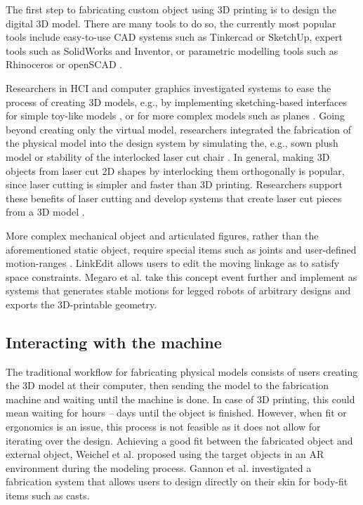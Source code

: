 The first step to fabricating custom object using 3D printing is to design the digital 3D model. There are many tools to do so, the currently most popular tools include easy-to-use CAD systems such as Tinkercad or SketchUp, expert tools such as SolidWorks and Inventor, or parametric modelling tools such as Rhinoceros or openSCAD \cite{imaterialise2017}. 

Researchers in HCI and computer graphics investigated systems to ease the process of creating 3D models, e.g., by implementing sketching-based interfaces for simple toy-like models \cite{Igarashi1999}, or for more complex models such as planes  \cite{Tsang2004, Bae2008, Bae2009}. Going beyond creating only the virtual model, researchers integrated the fabrication of the physical model into the design system by simulating the, e.g., sown plush model \cite{Mori2007} or stability of the interlocked laser cut chair \cite{Saul2011}. In general, making 3D objects from laser cut 2D shapes by interlocking them orthogonally is popular, since laser cutting is simpler and faster than 3D printing. Researchers support these benefits of laser cutting and develop systems that create laser cut pieces from a 3D model \cite{Hildebrand2012, McCrae2014}.

More complex mechanical object and articulated figures, rather than the aforementioned static object, require special items such as joints \cite{Ureta2016} and user-defined motion-ranges \cite{Megaro2014}. LinkEdit \cite{Bacher2015} allows users to edit the moving linkage as to satisfy space constraints. Megaro et al. \cite{Megaro2015} take this concept event further and implement as systems that generates stable motions for legged robots of arbitrary designs and exports the 3D-printable geometry.


\subsection{Interacting with the machine}

The traditional workflow for fabricating physical models consists of users creating the 3D model at their computer, then sending the model to the fabrication machine and waiting until the machine is done. In case of 3D printing, this could mean waiting for hours -- days until the object is finished. However, when fit or ergonomics is an issue, this process is not feasible as it does not allow for iterating over the design. Achieving a good fit between the fabricated object and external object, Weichel et al. \cite{Weichel2014, Weichel2015} proposed using the target objects in an AR environment during the modeling process. Gannon et al. \cite{Gannon2015} investigated a fabrication system that allows users to design directly on their skin for body-fit items such as casts.

